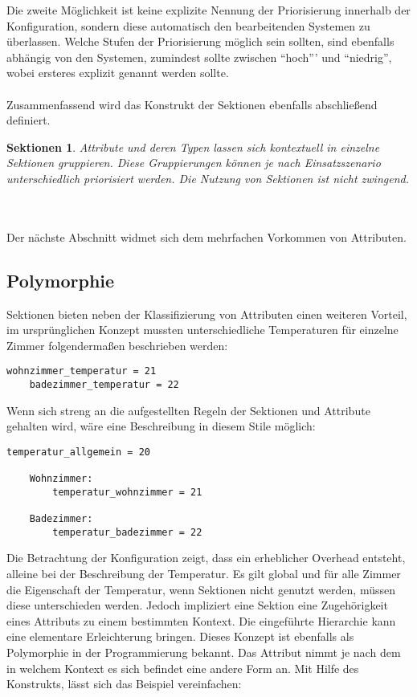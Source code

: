 Die zweite Möglichkeit ist keine explizite Nennung der Priorisierung innerhalb der Konfiguration, sondern diese automatisch den bearbeitenden Systemen zu überlassen. 
Welche Stufen der Priorisierung möglich sein sollten, sind ebenfalls abhängig von den Systemen, zumindest sollte zwischen "`hoch"'' und "`niedrig"', wobei ersteres explizit genannt werden sollte. 
\\\\
Zusammenfassend wird das Konstrukt der Sektionen ebenfalls abschließend definiert.
\newtheorem{mydef}{Sektionen}
\begin{mydef}
Attribute und deren Typen lassen sich kontextuell in einzelne Sektionen gruppieren. Diese Gruppierungen können je nach Einsatzszenario unterschiedlich priorisiert werden. Die Nutzung von Sektionen ist nicht zwingend.
\end{mydef}
\\\\
Der nächste Abschnitt widmet sich dem mehrfachen Vorkommen von Attributen.

\subsection{Polymorphie}
Sektionen bieten neben der Klassifizierung von Attributen einen weiteren Vorteil, im ursprünglichen Konzept mussten unterschiedliche Temperaturen für einzelne Zimmer folgendermaßen beschrieben werden:

\lstset{language=bash}
\begin{lstlisting}[caption=Sammlung von Attributen ohne Polymorphie, captionpos=b]
  	wohnzimmer_temperatur = 21
	badezimmer_temperatur = 22
\end{lstlisting}

Wenn sich streng an die aufgestellten Regeln der Sektionen und Attribute gehalten wird, wäre eine Beschreibung in diesem Stile möglich: 


\lstset{language=bash}
\begin{lstlisting}[caption=Beispiel einer Konfiguration ohne Polymorphie, captionpos=b]
  temperatur_allgemein = 20
	
	Wohnzimmer: 
		temperatur_wohnzimmer = 21
	
	Badezimmer: 
		temperatur_badezimmer = 22

\end{lstlisting}
 
Die Betrachtung der Konfiguration zeigt, dass ein erheblicher Overhead entsteht, alleine bei der Beschreibung der Temperatur. Es gilt global und für alle Zimmer die Eigenschaft der Temperatur, wenn Sektionen nicht genutzt werden, müssen diese unterschieden werden. Jedoch impliziert eine Sektion eine Zugehörigkeit eines Attributs zu einem bestimmten Kontext. Die eingeführte Hierarchie kann eine elementare Erleichterung bringen. Dieses Konzept ist ebenfalls als Polymorphie in der Programmierung bekannt. Das Attribut nimmt je nach dem in welchem Kontext es sich befindet eine andere Form an. Mit Hilfe des Konstrukts, lässt sich das Beispiel vereinfachen: 

